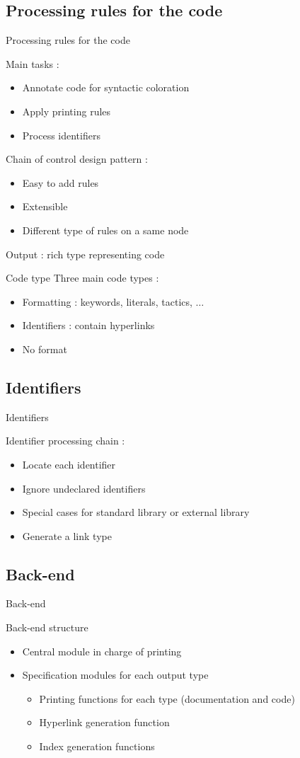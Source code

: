 \documentclass[compress]{beamer}
\newenvironment{tframe}[1]{
  \subsection{#1}
  \begin{frame}{#1}
  }{
  \end{frame}
  }
\begin{document}
  \begin{tframe}{Processing rules for the code}
    Main tasks :
    \begin{itemize}
      \item Annotate code for syntactic coloration
      \item Apply printing rules
      \item Process identifiers
    \end{itemize}
    \vfill
    Chain of control design pattern :
    \begin{itemize}
      \item Easy to add rules
      \item Extensible
      \item Different type of rules on a same node
    \end{itemize}
    Output : rich type representing code
  \end{tframe}

  \begin{frame}{Code type}
    Three main code types :
    \begin{itemize}
      \item Formatting : keywords, literals, tactics, $\ldots$
      \item Identifiers : contain hyperlinks
      \item No format
    \end{itemize}
  \end{frame}

  \begin{tframe}{Identifiers}
    Identifier processing chain :
    \begin{itemize}
      \item Locate each identifier
      \item Ignore undeclared identifiers
      \item Special cases for standard library or external library
      \item Generate a link type
    \end{itemize}
  \end{tframe}

  \begin{tframe}{Back-end}
    Back-end structure
    \begin{itemize}
      \item Central module in charge of printing
      \item Specification modules for each output type
        \begin{itemize}
          \item Printing functions for each type (documentation and code)
          \item Hyperlink generation function
          \item Index generation functions
        \end{itemize}
    \end{itemize}
  \end{tframe}
\end{document}
